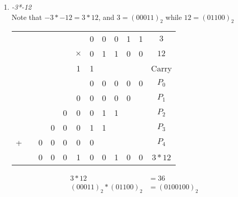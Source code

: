 \documentclass[12pt]{article}
\begin{document}
\begin{enumerate}
\begin{enumerate}
          \item \textit{-3*-12}\\
            Note that $-3 * -12 = 3*12$, and $3 = (00011)_2$ while $12 = (01100)_2$
            \begin{center}
              \begin{tabular}{c c c c c c c c c c c | c}
                &&&&&& 0 & 0 & 0 & 1 & 1 & $3$\\
                &&&&&$\times$ & 0 & 1 & 1 & 0 & 0 & $12$\\
                \hline
                &&&&& 1 & 1 &&&&& Carry \\
                &&&&&& 0 & 0 & 0 & 0 & 0 & $P_0$ \\
                &&&&& 0 & 0 & 0 & 0 & 0 && $P_1$ \\
                &&&& 0 & 0 & 0 & 1 & 1 &&& $P_2$ \\
                &&& 0 & 0 & 0 & 1 & 1 &&&& $P_3$ \\
              + && 0 & 0 & 0 & 0 & 0 &&&&& $P_4$ \\
                \hline
                && 0 & 0 & 0 & 1 & 0 & 0 & 1 & 0 & 0 & $3*12$
              \end{tabular}
              \begin{align*}
                3*12 &= 36 \\
                (00011)_2 * (01100)_2 &= \boxed{(0100100)_2}
              \end{align*}
            \end{center}
        \end{enumerate}
      \end{enumerate}
\end{document}
